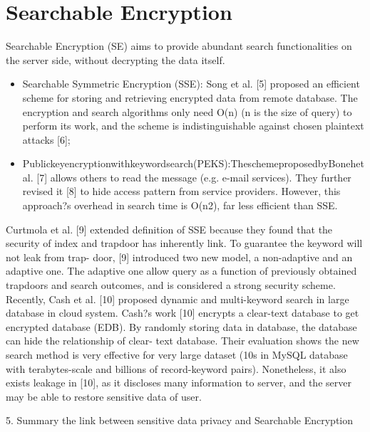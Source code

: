 \section{Searchable Encryption}
Searchable Encryption (SE) aims to provide abundant search functionalities on the server side, without decrypting the data itself.
\begin{itemize}
\item Searchable Symmetric Encryption (SSE): Song et al. [5] proposed an efficient scheme for storing and retrieving encrypted data from remote database. The encryption and search algorithms only need O(n) (n is the size of query) to perform its work, and the scheme is indistinguishable against chosen plaintext attacks [6];
\item Publickeyencryptionwithkeywordsearch(PEKS):TheschemeproposedbyBonehet al. [7] allows others to read the message (e.g. e-mail services). They further revised it [8] to hide access pattern from service providers. However, this approach?s overhead in search time is O(n2), far less efficient than SSE.
\end{itemize}
Curtmola et al. [9] extended definition of SSE because they found that the security of index and trapdoor has inherently link. To guarantee the keyword will not leak from trap- door, [9] introduced two new model, a non-adaptive and an adaptive one. The adaptive one allow query as a function of previously obtained trapdoors and search outcomes, and is considered a strong security scheme.
Recently, Cash et al. [10] proposed dynamic and multi-keyword search in large database in cloud system. Cash?s work [10] encrypts a clear-text database to get encrypted database (EDB). By randomly storing data in database, the database can hide the relationship of clear- text database. Their evaluation shows the new search method is very effective for very large dataset (10s in MySQL database with terabytes-scale and billions of record-keyword pairs). Nonetheless, it also exists leakage in [10], as it discloses many information to server, and the server may be able to restore sensitive data of user.


5. Summary the link between sensitive data privacy and Searchable Encryption 